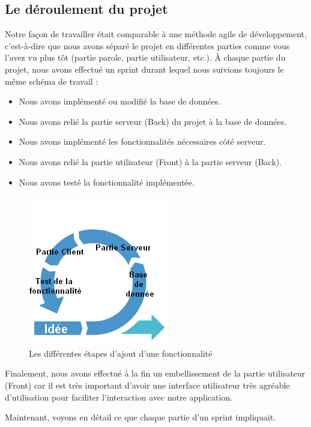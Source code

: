 \documentclass[12pt,french]{article}
\begin{document}
\subsection{Le déroulement du projet}

Notre façon de travailler était comparable à une méthode agile de développement, c'est-à-dire que nous avons séparé le projet en différentes parties comme vous l'avez vu plus tôt (partie parole, partie utilisateur, etc.). À chaque partie du projet, nous avons effectué un \gls{sprint} durant lequel nous suivions toujours le même schéma de travail :

\begin{itemize}
	\item Nous avons implémenté ou modifié la base de données.
	\item Nous avons relié la partie serveur (\gls{Back}) du projet à la base de données.
	\item Nous avons implémenté les fonctionnalités nécessaires côté serveur.
	\item Nous avons relié la partie utilisateur (\gls{Front}) à la partie serveur (\gls{Back}).
	\item Nous avons testé la fonctionnalité implémentée.
\end{itemize}

\begin{figure}[H]
	\centering
	\includegraphics[scale=1]{agile.png}
	\caption{Les différentes étapes d'ajout d'une fonctionnalité}
\end{figure}

Finalement, nous avons effectué à la fin un embellissement de la partie utilisateur (\gls{Front}) car il est très important d'avoir une interface utilisateur très agréable d'utilisation pour faciliter l'interaction avec notre application.

Maintenant, voyons en détail ce que chaque partie d'un \gls{sprint} impliquait.
\end{document}
